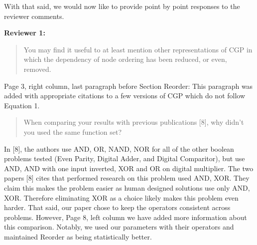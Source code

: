 \documentclass{letter}
\begin{document}
\begin{letter}{}
\begin{comment}
A major focus of our work (ordering effect on the location and number of active genes)
is grounded in theory which makes no assumptions on the type of problem being solved.
Furthermore, the operators we investigate deal with domain independent problems.
As the experimental results matched the theory, we have no reason to suspect our
conclusions on these topics to change when the operators or data type is changed.
However, we understand that the following could change depending on data type: The relative effectiveness
of the proposed modifications (IE, skip vs single, reorder vs normal, etc), the
evolved genome sizes, and the charts in Table IV and Table V.  Yet we do not feel
these are the primary concern of the work, nor do we have any reason to believe
the conclusions should only hold true for binary problems.
\end{comment}

With that said, we would now like to provide point by point responses to the reviewer
comments.

\textbf{Reviewer 1:}

\begin{quote}
You may find it useful to at least mention other representations of CGP in
which the dependency of node ordering has been reduced, or even, removed.
\end{quote}
Page 3, right column, last paragraph before Section Reorder: This paragraph was
added with appropriate citations to a few versions of CGP which do not follow Equation 1.

\begin{quote}
When comparing your results with previous publications [8], why didn't you used the same function set?
\end{quote}
In [8], the authors use AND, OR, NAND, NOR for all of the other boolean problems tested (Even Parity, Digital Adder, and Digital Comparitor),
but use AND, AND with one input inverted, XOR and OR on digital multiplier.
The two papers [8] cites that performed research on this problem used AND, XOR.  They claim this makes the problem easier as
human designed solutions use only AND, XOR.  Therefore eliminating XOR as a choice likely makes this problem even harder.
That said, our paper chose to keep the operators consistent across problems.
However, Page 8, left column we have added more
information about this comparison.  Notably, we used our parameters with their operators
and maintained Reorder as being statistically better.


\end{letter}
\end{document}
